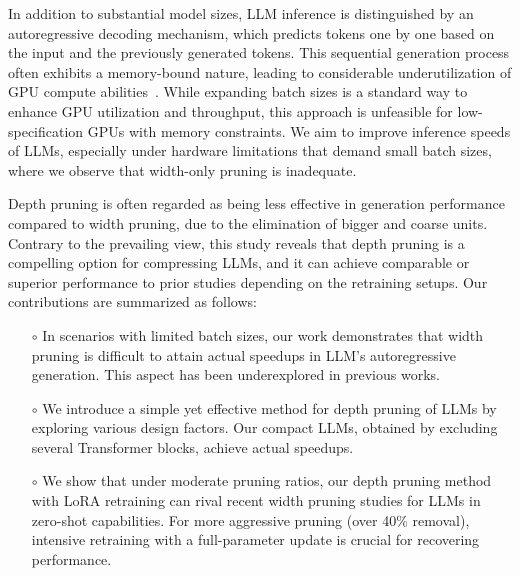 In addition to substantial model sizes, LLM inference is distinguished by an autoregressive decoding mechanism, which predicts tokens one by one based on the input and the previously generated tokens. This sequential generation process often exhibits a memory-bound nature, leading to considerable underutilization of GPU compute abilities~\cite{kwon2023efficient,jin2023s}. While expanding batch sizes is a standard way to enhance GPU utilization and throughput, this approach is unfeasible for low-specification GPUs with memory constraints. We aim to improve inference speeds of LLMs, especially under hardware limitations that demand small batch sizes, where we observe that width-only pruning is inadequate.

Depth pruning is often regarded as being less effective in generation performance compared to width pruning, due to the elimination of bigger and coarse units. Contrary to the prevailing view, this study reveals that depth pruning is a compelling option for compressing LLMs, and it can achieve comparable or superior performance to prior studies depending on the retraining setups. Our contributions are summarized as follows:

\begin{enumerate}[itemsep=0em]
\setlength{\leftskip}{-0.22cm}
\vspace{-0.025in}
\item[$\circ$] In scenarios with limited batch sizes, our work demonstrates that width pruning is difficult to attain actual speedups in LLM's autoregressive generation. This aspect has been underexplored in previous works.

\vspace{-0.02in}
\item[$\circ$] We introduce a simple yet effective method for depth pruning of LLMs by exploring various design factors. Our compact LLMs, obtained by excluding several Transformer blocks, achieve actual speedups. 

\vspace{-0.02in}
\item[$\circ$] We show that under moderate pruning ratios, our depth pruning method with LoRA retraining can rival recent width pruning studies for LLMs in zero-shot capabilities. For more aggressive pruning (over 40\% removal), intensive retraining with a full-parameter update is crucial for recovering performance.

\setlength{\leftskip}{0pt}
\end{enumerate}

